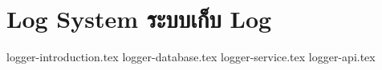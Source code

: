 \clearpage
\section{
\ifenglish Log System
\else ระบบเก็บ Log
\fi}

\newcommand{\loggerDir}{chapters/approach/logger}
{logger-introduction.tex}
{logger-database.tex}
{logger-service.tex}
{logger-api.tex}